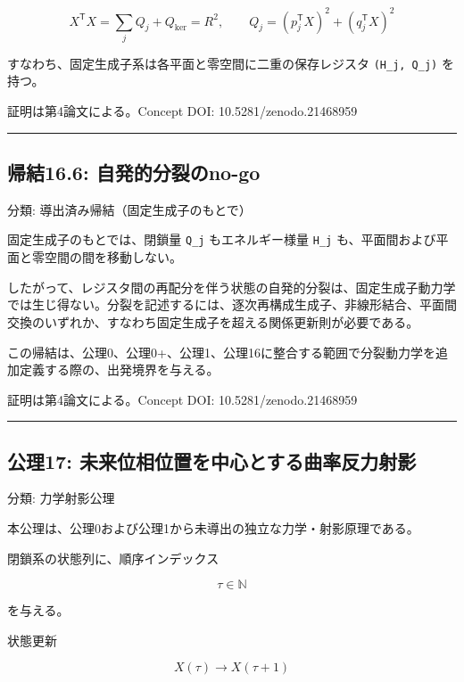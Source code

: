 \documentclass[
  a4paper,
]{ltjsarticle}
\begin{document}
\[
X^{\mathsf T}X=\sum_{j}Q_j+Q_{\ker}=R^2,
\qquad
Q_j=(p_j^{\mathsf T}X)^2+(q_j^{\mathsf T}X)^2
\]

すなわち、固定生成子系は各平面と零空間に二重の保存レジスタ
\texttt{(H\_j,\ Q\_j)} を持つ。

証明は第4論文による。Concept DOI: 10.5281/zenodo.21468959

\begin{center}\rule{0.5\linewidth}{0.5pt}\end{center}

\subsection{帰結16.6:
自発的分裂のno-go}\label{ux5e30ux7d5016.6-ux81eaux767aux7684ux5206ux88c2ux306eno-go}

分類: 導出済み帰結（固定生成子のもとで）

固定生成子のもとでは、閉鎖量 \texttt{Q\_j} もエネルギー様量
\texttt{H\_j} も、平面間および平面と零空間の間を移動しない。

したがって、レジスタ間の再配分を伴う状態の自発的分裂は、固定生成子動力学では生じ得ない。分裂を記述するには、逐次再構成生成子、非線形結合、平面間交換のいずれか、すなわち固定生成子を超える関係更新則が必要である。

この帰結は、公理0、公理0+、公理1、公理16に整合する範囲で分裂動力学を追加定義する際の、出発境界を与える。

証明は第4論文による。Concept DOI: 10.5281/zenodo.21468959

\begin{center}\rule{0.5\linewidth}{0.5pt}\end{center}

\subsection{公理17:
未来位相位置を中心とする曲率反力射影}\label{ux516cux740617-ux672aux6765ux4f4dux76f8ux4f4dux7f6eux3092ux4e2dux5fc3ux3068ux3059ux308bux66f2ux7387ux53cdux529bux5c04ux5f71}

分類: 力学射影公理

本公理は、公理0および公理1から未導出の独立な力学・射影原理である。

閉鎖系の状態列に、順序インデックス

\[
\tau\in\mathbb{N}
\]

を与える。

状態更新

\[
X(\tau)\longrightarrow X(\tau+1)
\]
\end{document}
